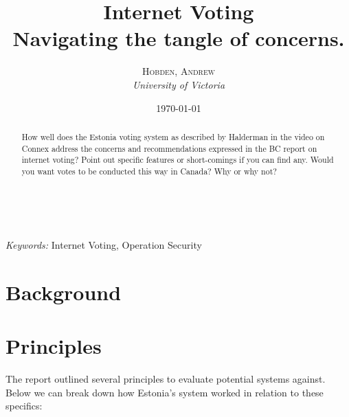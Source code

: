 \documentclass[a4paper, 11pt]{article} %
\title{
    \textbf{Internet Voting}\\ %
    Navigating the tangle of concerns.
} %
\author{\textsc{Hobden, Andrew} %
\\{\textit{University of Victoria}}} %
\date{\today} %
\makeatletter
\renewcommand{\maketitle}{ %
\begin{flushright} %
{\LARGE\@title} %

\vspace{50pt} %

{\large\@author} %
\\\@date %

\vspace{40pt} %
\end{flushright}
}
\makeatother
\begin{document}
\maketitle %



\begin{abstract}
    How well does the Estonia voting system as described by Halderman in the video on Connex address the concerns and recommendations expressed in the BC report on internet voting?  Point out specific features or short-comings if you can find any. Would you want votes to be conducted this way in Canada? Why or why not?
\end{abstract}

\hspace*{3,6mm}\textit{Keywords:} Internet Voting, Operation Security %

\vspace{30pt} %


\section*{Background}


\section*{Principles}

The report \cite{internet-voting-report} outlined several principles to evaluate potential systems against. Below we can break down how Estonia's system worked in relation to these specifics:
\end{document}
